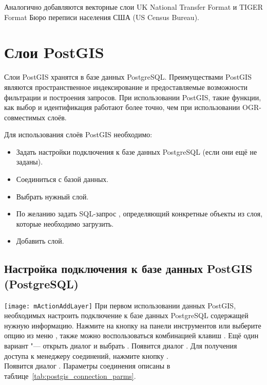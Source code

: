 Аналогично добавляются векторные слои UK National Transfer Format и
TIGER Format Бюро переписи населения США (US Census Bureau).

\section{Слои PostGIS}
\label{label_postgis}

Слои PostGIS хранятся в базе данных PostgreSQL. Преимуществами PostGIS
являются пространственное индексирование и предоставляемые возможности
фильтрации и построения запросов. При использовании PostGIS, такие функции,
как выбор и идентификация работают более точно, чем при использовании
OGR-совместимых слоёв.

Для использования слоёв PostGIS необходимо:

\begin{itemize}[label=--]
\item Задать настройки подключения \qg к базе данных PostgreSQL (если они
ещё не заданы).
\item Соединиться с базой данных.
\item Выбрать нужный слой.
\item По желанию задать SQL-запрос , определяющий конкретные
объекты из слоя, которые необходимо загрузить.
\item Добавить слой.
\end{itemize}

\subsection{Настройка подключения к базе данных PostGIS (PostgreSQL)}\label{sec:postgis_stored}

\texttt{[image: mActionAddLayer]} При первом использовании
данных PostGIS, необходимых настроить подключение к базе данных PostgreSQL
содержащей нужную информацию. Нажмите на кнопку
 на панели инструментов
или выберите опцию 
из меню , также можно воспользоваться комбинацией клавиш
. Ещё один вариант "--- открыть диалог
 и выбрать .
Появится диалог . Для получения доступа
к менеджеру соединений, нажмите кнопку
. \\
Появится диалог . Параметры соединения
описаны в таблице~\ref{tab:postgis_connection_parms}.

